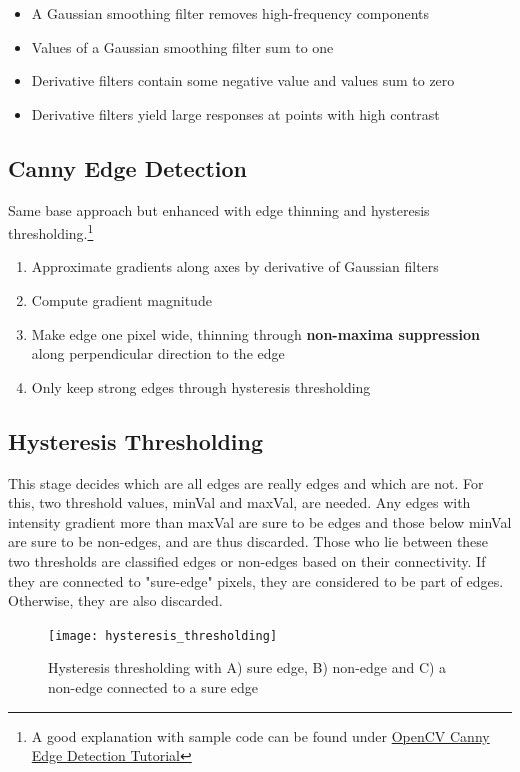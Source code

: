 \begin{itemize}
	\item A Gaussian smoothing filter removes high-frequency components
	\item Values of a Gaussian smoothing filter sum to one
	\item Derivative filters contain some negative value and values sum to zero
	\item Derivative filters yield large responses at points with high contrast
\end{itemize}

\subsection{Canny Edge Detection}
Same base approach but enhanced with edge thinning and hysteresis thresholding.\footnote{A good explanation with sample code can be
found under \href{https://docs.opencv.org/4.3.0/da/d22/tutorial_py_canny.html}{OpenCV Canny Edge Detection Tutorial}}
\begin{enumerate}
	\item Approximate gradients along axes by derivative of Gaussian filters
	\item Compute gradient magnitude
	\item Make edge one pixel wide, thinning through \textbf{non-maxima suppression} along perpendicular direction to the edge
	\item Only keep strong edges through hysteresis thresholding
\end{enumerate}

\subsection{Hysteresis Thresholding}
This stage decides which are all edges are really edges and which are not. For this, two threshold values, minVal and maxVal, are needed.
Any edges with intensity gradient more than maxVal are sure to be edges and those below minVal are sure to be non-edges, and are thus discarded.
Those who lie between these two thresholds are classified edges or non-edges based on their connectivity. If they are connected to "sure-edge" pixels,
they are considered to be part of edges. Otherwise, they are also discarded.

\begin{figure}[H]
	\centering
	\texttt{[image: hysteresis\_thresholding]}
	\caption{Hysteresis thresholding with A) sure edge, B) non-edge and C) a non-edge connected to a sure edge}
\end{figure}
